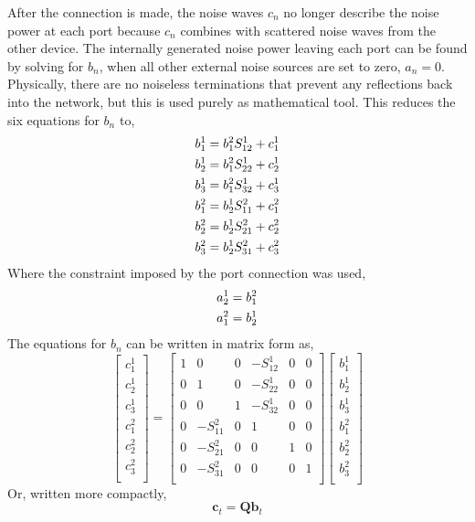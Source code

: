 \documentclass[journal]{IEEEtran}
\begin{document}
After the connection is made, the noise waves \(c_n\) no longer describe the noise power at each port because \(c_n\) combines with scattered noise waves from the other device. The internally generated noise power leaving each port can be found by solving for \(b_n\), when all other external noise sources are set to zero, \(a_n = 0\). Physically, there are no noiseless terminations that prevent any reflections back into the network, but this is used purely as mathematical tool. This reduces the six equations for \(b_n\) to,
\begin{gather}
b_1^1 = b_1^2 S_{12}^1 + c_1^1 \notag\\
b_2^1 = b_1^2 S_{22}^1 + c_2^1 \notag\\
b_3^1 = b_1^2 S_{32}^1 + c_3^1 \notag\\
b_1^2 = b_2^1 S_{11}^2 + c_1^2 \notag\\
b_2^2 = b_2^1 S_{21}^2 + c_2^2 \notag\\
b_3^2 = b_2^1 S_{31}^2 + c_3^2 \notag
\end{gather}
Where the constraint imposed by the port connection was used,
\begin{gather}
a_2^1 = b_1^2 \notag \\
a_1^2 = b_2^1 \notag
\end{gather}
%
The equations for \(b_n\) can be written in matrix form as,
%
\[
\renewcommand*{\arraystretch}{1.2}
\begin{bmatrix}
c_1^1 \\
c_2^1 \\
c_3^1 \\
c_1^2 \\
c_2^2 \\
c_3^2 \\
\end{bmatrix}
=
\begin{bmatrix}
1            & 0         & 0   & -S_{12}^1     & 0  & 0 \\
0            & 1         & 0   & -S_{22}^1     & 0  & 0 \\
0            & 0         & 1   & -S_{32}^1     & 0  & 0 \\
0            & -S_{11}^2  & 0   & 1     & 0  &0\\
0            & -S_{21}^2  & 0   & 0     & 1  &0         \\
0            & -S_{31}^2  & 0   & 0     & 0  &1         \\
\end{bmatrix}
\begin{bmatrix}
b_1^1 \\
b_2^1 \\
b_3^1 \\
b_1^2 \\
b_2^2 \\
b_3^2 \\
\end{bmatrix}
\]
Or, written more compactly,
\[\mathbf{c}_t = \mathbf{Q} \mathbf{b}_t \]
\end{document}
